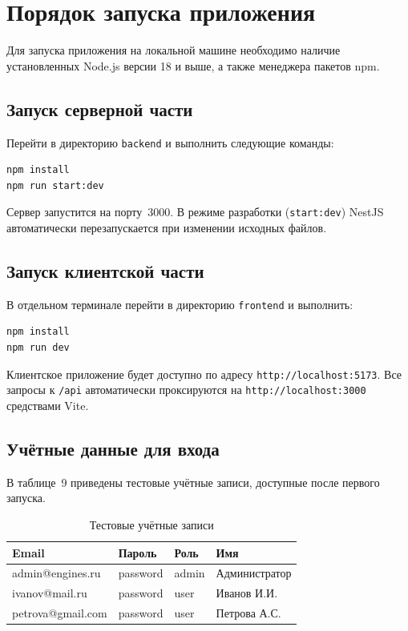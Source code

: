 \documentclass[14pt,a4paper]{extarticle}
\begin{document}
\newpage

\section{Порядок запуска приложения}

Для запуска приложения на локальной машине необходимо наличие установленных Node.js версии 18 и выше, а также менеджера пакетов npm.

\subsection{Запуск серверной части}

Перейти в директорию \texttt{backend} и выполнить следующие команды:

\begin{lstlisting}
npm install
npm run start:dev
\end{lstlisting}

Сервер запустится на порту~3000. В режиме разработки (\texttt{start:dev}) NestJS автоматически перезапускается при изменении исходных файлов.

\subsection{Запуск клиентской части}

В отдельном терминале перейти в директорию \texttt{frontend} и выполнить:

\begin{lstlisting}
npm install
npm run dev
\end{lstlisting}

Клиентское приложение будет доступно по адресу \texttt{http://localhost:5173}. Все запросы к \texttt{/api} автоматически проксируются на \texttt{http://localhost:3000} средствами Vite.

\subsection{Учётные данные для входа}

В таблице~9 приведены тестовые учётные записи, доступные после первого запуска.

\begin{table}[h!]
\caption{Тестовые учётные записи}
\begin{tabular}{|p{4.5cm}|p{3cm}|p{3cm}|p{3cm}|}
\hline
\textbf{Email} & \textbf{Пароль} & \textbf{Роль} & \textbf{Имя} \\
\hline
admin@engines.ru  & password & admin & Администратор \\
ivanov@mail.ru    & password & user  & Иванов И.И. \\
petrova@gmail.com & password & user  & Петрова А.С. \\
\hline
\end{tabular}
\end{table}
\end{document}
